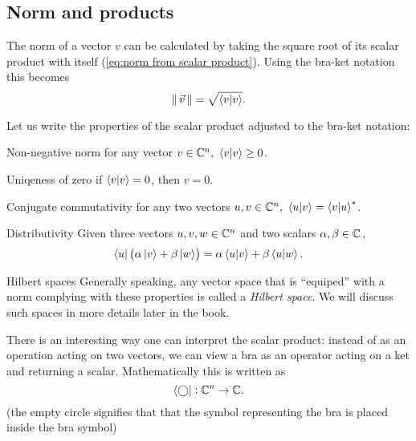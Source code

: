 \subsection{Norm and products}
The norm of a vector $v$ can be calculated by taking the square root of its scalar product with itself (\autoref{eq:norm from scalar product}). Using the bra-ket notation this becomes
\begin{equation}
	\norm{v} = \sqrt{\innerproduct{v}}.
	\label{eq:norm_braket}
\end{equation}

Let us write the properties of the scalar product adjusted to the bra-ket notation:
\begin{descitemize}
	\item[Non-negative norm] for any vector $v\in\Cs[n],\ \innerproduct{v}\geq0$.
	\item[Uniqeness of zero] if $\innerproduct{v}=0$, then $v=0$.
	\item[Conjugate commutativity] for any two vectors $u,v\in\Cs[n],\ \innerproduct{u}{v}=\sconj{\innerproduct{v}{u}}$.
	\item[Distributivity] Given three vectors $u,v,w\in\Cs[n]$ and two scalars $\alpha,\beta\in\Cs$,
		\[
			\bra{u} \left( \alpha\ket{v}+\beta\ket{w} \right) = \alpha\innerproduct{u}{v} + \beta\innerproduct{u}{w}.
		\]
\end{descitemize}

\begin{note}{Hilbert spaces}
Generally speaking, any vector space that is ``equiped'' with a norm complying with these properties is called a \emph{Hilbert space}. We will discuss such spaces in more details later in the book.
\end{note}

There is an interesting way one can interpret the scalar product: instead of as an operation acting on two vectors, we can view a bra as an operator acting on a ket and returning a scalar. Mathematically this is written as
\begin{equation}
	\bra{\bigcirc}: \Cs[n]\to\Cs.
	\label{eq:bra_as_operator}
\end{equation}
(the empty circle signifies that that the symbol representing the bra is placed inside the bra symbol)


